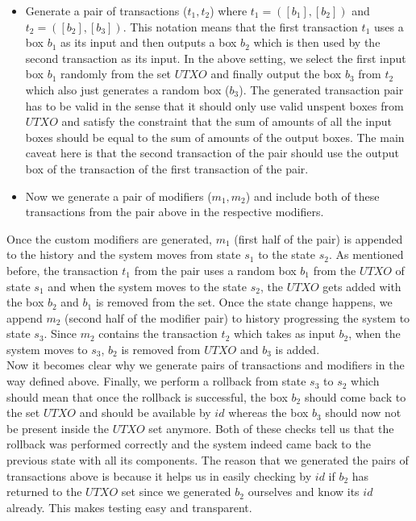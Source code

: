 \begin{enumerate}[\IEEEsetlabelwidth{Z}]
\begin{itemize}[]
\begin{itemize}
\item Generate a pair of transactions ($t_1, t_2$) where $t_1 = ([b_{1}], [b_{2}])$ and $t_2 = ([b_{2}], [b_{3}])$. This notation means that the first transaction $t_1$ uses a box $b_1$ as its input and then outputs a box $b_2$ which is then used by the second transaction as its input. In the above setting, we select the first input box $b_1$ randomly from the set $UTXO$ and finally output the box $b_3$ from $t_2$ which also just generates a random box ($b_3$). The generated transaction pair has to be valid in the sense that it should only use valid unspent boxes from $UTXO$ and satisfy the constraint that the sum of amounts of all the input boxes should be equal to the sum of amounts of the output boxes. The main caveat here is that the second transaction of the pair should use the output box of the transaction of the first transaction of the pair.
\item Now we generate a pair of modifiers ($m_1, m_2$) and include both of these transactions from the pair above in the respective modifiers.
\end{itemize}

Once the custom modifiers are generated, $m_1$ (first half of the pair) is appended to the history and the system moves from state $s_1$ to the state $s_2$. As mentioned before, the transaction $t_1$ from the pair uses a random box $b_1$ from the $UTXO$ of state $s_1$ and when the system moves to the state $s_2$, the $UTXO$ gets added with the box $b_2$ and $b_1$ is removed from the set. Once the state change happens, we append $m_2$ (second half of the modifier pair) to history progressing the system to state $s_3$. Since $m_2$ contains the transaction $t_2$ which takes as input $b_2$, when the system moves to $s_3$, $b_2$ is removed from $UTXO$ and $b_3$ is added.\\

Now it becomes clear why we generate pairs of transactions and modifiers in the way defined above. Finally, we perform a rollback from state $s_3$ to $s_2$ which should mean that once the rollback is successful, the box $b_2$ should come back to the set $UTXO$ and should be available by $id$ whereas the box $b_3$ should now not be present inside the $UTXO$ set anymore. Both of these checks tell us that the rollback was performed correctly and the system indeed came back to the previous state with all its components. The reason that we generated the pairs of transactions above is because it helps us in easily checking by $id$ if $b_2$ has returned to the $UTXO$ set since we generated $b_2$ ourselves and know its $id$ already. This makes testing easy and transparent. \\


\end{itemize}
\end{enumerate}
